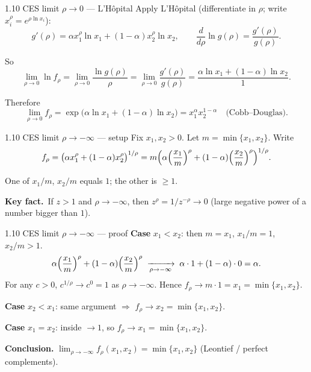 \documentclass[11pt,aspectratio=169]{beamer}
\begin{document}
\begin{frame}{1.10 CES limit $\rho\to 0$ --- L'H\^{o}pital}
  \footnotesize
  Apply L'H\^{o}pital (differentiate in $\rho$; write $x_i^{\rho}=e^{\rho\ln x_i}$):
  \[
    g'(\rho)
    =\alpha x_1^{\rho}\ln x_1+(1-\alpha)x_2^{\rho}\ln x_2,
    \qquad
    \frac{d}{d\rho}\ln g(\rho)
    =\frac{g'(\rho)}{g(\rho)}.
  \]

  \medskip
  So
  \[
    \lim_{\rho\to 0}\ln f_{\rho}
    =\lim_{\rho\to 0}\frac{\ln g(\rho)}{\rho}
    =\lim_{\rho\to 0}\frac{g'(\rho)}{g(\rho)}
    =\frac{\alpha\ln x_1+(1-\alpha)\ln x_2}{1}.
  \]

  \medskip
  Therefore
  \[
    \lim_{\rho\to 0}f_{\rho}
    =\exp\bigl(\alpha\ln x_1+(1-\alpha)\ln x_2\bigr)
    =x_1^{\alpha}x_2^{1-\alpha}
    \quad\text{(Cobb--Douglas).}
  \]
\end{frame}

\begin{frame}{1.10 CES limit $\rho\to-\infty$ --- setup}
  \footnotesize
  Fix $x_1,x_2>0$. Let $m=\min\{x_1,x_2\}$. Write
  \[
    f_{\rho}
    =\bigl(\alpha x_1^{\rho}+(1-\alpha)x_2^{\rho}\bigr)^{1/\rho}
    =m\Bigl(\alpha\Bigl(\frac{x_1}{m}\Bigr)^{\rho}
    +(1-\alpha)\Bigl(\frac{x_2}{m}\Bigr)^{\rho}\Bigr)^{1/\rho}.
  \]

  \medskip
  One of $x_1/m$, $x_2/m$ equals $1$; the other is $\ge 1$.

  \medskip
  \textbf{Key fact.}\ If $z>1$ and $\rho\to-\infty$, then
  $z^{\rho}=1/z^{-\rho}\to 0$
  (large negative power of a number bigger than $1$).
\end{frame}

\begin{frame}{1.10 CES limit $\rho\to-\infty$ --- proof}
  \footnotesize
  \textbf{Case} $x_1<x_2$: then $m=x_1$, $x_1/m=1$, $x_2/m>1$.
  \[
    \alpha\Bigl(\frac{x_1}{m}\Bigr)^{\rho}+(1-\alpha)\Bigl(\frac{x_2}{m}\Bigr)^{\rho}
    \;\xrightarrow[\rho\to-\infty]{}\;
    \alpha\cdot 1+(1-\alpha)\cdot 0=\alpha.
  \]
  For any $c>0$, $c^{1/\rho}\to c^{0}=1$ as $\rho\to-\infty$.
  Hence $f_{\rho}\to m\cdot 1=x_1=\min\{x_1,x_2\}$.

  \medskip
  \textbf{Case} $x_2<x_1$: same argument $\Rightarrow$ $f_{\rho}\to x_2=\min\{x_1,x_2\}$.

  \medskip
  \textbf{Case} $x_1=x_2$: inside $\to 1$, so $f_{\rho}\to x_1=\min\{x_1,x_2\}$.

  \medskip
  \textbf{Conclusion.}
  $\displaystyle\lim_{\rho\to-\infty}f_{\rho}(x_1,x_2)=\min\{x_1,x_2\}$
  (Leontief / perfect complements).
\end{frame}
\end{document}
